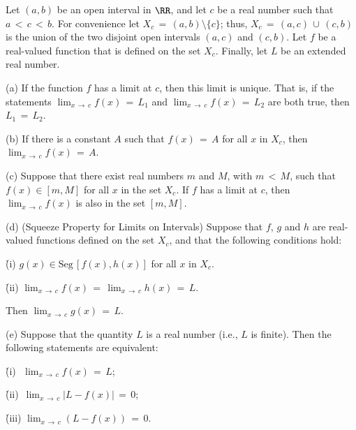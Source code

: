 {        Let $(a,b)$ be an open interval in ${\RR}$, and let $c$ be a real number such that $a\,<\,c\,<\,b$.
    For convenience let $X_{c} \,=\, (a,b){\setminus}\{c\}$;
    thus, $X_{c} \,=\, (a,c)\,{\cup}\,(c,b)$ is the union of the two disjoint open intervals $(a,c)$ and $(c,b)$.
    Let $f$ be a real-valued function that is defined on the set $X_{c}$.
    Finally, let $L$ be an extended real number.

\V

        (a) If the function $f$ has a limit at $c$, then this limit is unique.
    That is, if the statements ${\displaystyle \lim_{x \,{\rightarrow}\, c} f(x) \,=\, L_{1}}$ and ${\displaystyle \lim_{x \,{\rightarrow}\, c} f(x) \,=\, L_{2}}$ are both true, then $L_{1} \,=\, L_{2}$.

\V

        (b) If there is a constant $A$ such that $f(x) \,=\, A$ for all $x$ in $X_{c}$, then ${\displaystyle \lim_{x \,{\rightarrow}\, c} f(x)} \,=\, A$.

\V

        (c) Suppose that there exist real numbers $m$ and $M$, with $m\,<\,M$, such that $f(x){\in}[m,M]$ for all $x$ in the set $X_{c}$.
    If $f$ has a limit at $c$, then ${\displaystyle \lim_{x \,{\rightarrow}\, c} f(x)}$ is also in the set $[m,M]$.

\V

        (d) (Squeeze Property for Limits on Intervals) Suppose that $f$, $g$ and $h$ are real-valued functions defined on the set $X_{c}$, and that the following conditions hold:

        \h (i) $g(x){\in}\mbox{Seg}\,[f(x),h(x)]$ for all $x$ in $X_{c}$.

        \h (ii) ${\displaystyle \lim_{x \,{\rightarrow}\, c} f(x)
     \,=\, \lim_{x \,{\rightarrow}\, c} h(x) \,=\, L}$.

    Then ${\displaystyle \lim_{x \,{\rightarrow}\, c} g(x) \,=\, L}$.

\V

        (e) Suppose that the quantity $L$ is a real number (i.e., $L$ is finite).
    Then the following statements are equivalent:

        \h (i)\,\, ${\displaystyle \lim_{x \,{\rightarrow}\, c} f(x) \,=\, L}$;

        \h (ii)\, ${\displaystyle \lim_{x \,{\rightarrow}\, c} |L-f(x)| \,=\, 0}$;

        \h (iii) ${\displaystyle \lim_{x \,{\rightarrow}\, c} (L-f(x)) \,=\, 0}$.

}
